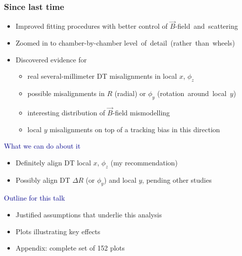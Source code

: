\documentclass[compress]{beamer}
\begin{document}


\begin{frame}
\frametitle{Since last time}
\begin{itemize}
\item Improved fitting procedures with better control of
  \mbox{$\vec{B}$-field and scattering\hspace{-1 cm}}
\item Zoomed in to chamber-by-chamber \mbox{level of detail (rather than wheels)\hspace{-1 cm}}
\item Discovered evidence for
\begin{itemize}
\item real several-millimeter DT misalignments in local $x$, $\phi_z$
\item possible misalignments in $R$ (radial) or $\phi_y$ \mbox{(rotation around local $y$)\hspace{-1 cm}}
\item interesting distribution of $\vec{B}$-field mismodelling
\item local $y$ misalignments on top of a tracking bias in this direction
\end{itemize}
\end{itemize}

\vspace{0.1 cm}
\hspace{-0.83 cm} \textcolor{darkblue}{\Large What we can do about it}

\begin{itemize}
\item Definitely align DT local $x$, $\phi_z$ (my recommendation)
\item Possibly align DT $\Delta R$ (or $\phi_y$) and local $y$, pending other studies
\end{itemize}

\vspace{0.3 cm}
\hspace{-0.83 cm} \textcolor{darkblue}{\Large Outline for this talk}

\begin{itemize}
\item Justified assumptions that underlie this analysis
\item Plots illustrating key effects
\item Appendix: complete set of 152 plots
\end{itemize}
\end{frame}
\end{document}
